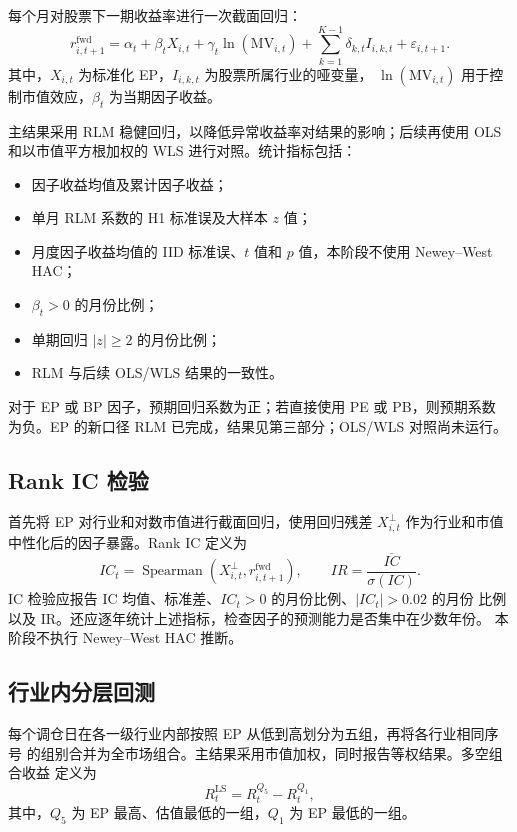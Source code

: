 \documentclass[UTF8,a4paper,11pt]{ctexart}
\begin{document}
每个月对股票下一期收益率进行一次截面回归：
\begin{equation}
  r^{\mathrm{fwd}}_{i,t+1}
  =\alpha_t+\beta_t X_{i,t}
  +\gamma_t\ln(\mathrm{MV}_{i,t})
  +\sum_{k=1}^{K-1}\delta_{k,t}I_{i,k,t}
  +\varepsilon_{i,t+1}.
\end{equation}
其中，$X_{i,t}$ 为标准化 EP，$I_{i,k,t}$ 为股票所属行业的哑变量，
$\ln(\mathrm{MV}_{i,t})$ 用于控制市值效应，$\beta_t$ 为当期因子收益。

主结果采用 RLM 稳健回归，以降低异常收益率对结果的影响；后续再使用 OLS
和以市值平方根加权的 WLS 进行对照。统计指标包括：
\begin{itemize}[leftmargin=2.5em]
  \item 因子收益均值及累计因子收益；
  \item 单月 RLM 系数的 H1 标准误及大样本 $z$ 值；
  \item 月度因子收益均值的 IID 标准误、$t$ 值和 $p$ 值，本阶段不使用
        Newey--West HAC；
  \item $\beta_t>0$ 的月份比例；
  \item 单期回归 $|z|\geq2$ 的月份比例；
  \item RLM 与后续 OLS/WLS 结果的一致性。
\end{itemize}

对于 EP 或 BP 因子，预期回归系数为正；若直接使用 PE 或 PB，则预期系数
为负。EP 的新口径 RLM 已完成，结果见第三部分；OLS/WLS 对照尚未运行。

\subsection{Rank IC 检验}

首先将 EP 对行业和对数市值进行截面回归，使用回归残差
$X^{\perp}_{i,t}$ 作为行业和市值中性化后的因子暴露。Rank IC 定义为
\begin{equation}
  IC_t=\operatorname{Spearman}
  \left(X^{\perp}_{i,t},r^{\mathrm{fwd}}_{i,t+1}\right),
  \qquad
  IR=\frac{\overline{IC}}{\sigma(IC)}.
\end{equation}
IC 检验应报告 IC 均值、标准差、$IC_t>0$ 的月份比例、$|IC_t|>0.02$ 的月份
比例以及 IR。还应逐年统计上述指标，检查因子的预测能力是否集中在少数年份。
本阶段不执行 Newey--West HAC 推断。

\subsection{行业内分层回测}

每个调仓日在各一级行业内部按照 EP 从低到高划分为五组，再将各行业相同序号
的组别合并为全市场组合。主结果采用市值加权，同时报告等权结果。多空组合收益
定义为
\begin{equation}
  R^{\mathrm{LS}}_t=R^{Q_5}_t-R^{Q_1}_t,
\end{equation}
其中，$Q_5$ 为 EP 最高、估值最低的一组，$Q_1$ 为 EP 最低的一组。
\end{document}
